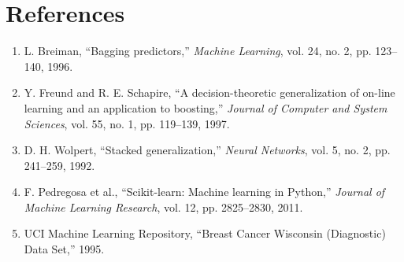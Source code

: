 \documentclass[12pt,a4paper]{article}
\begin{document}
\section{References}
\begin{enumerate}
    \item L. Breiman, ``Bagging predictors,'' \textit{Machine Learning}, vol. 24, no. 2, pp. 123--140, 1996.
    \item Y. Freund and R. E. Schapire, ``A decision-theoretic generalization of on-line learning and an application to boosting,'' \textit{Journal of Computer and System Sciences}, vol. 55, no. 1, pp. 119--139, 1997.
    \item D. H. Wolpert, ``Stacked generalization,'' \textit{Neural Networks}, vol. 5, no. 2, pp. 241--259, 1992.
    \item F. Pedregosa et al., ``Scikit-learn: Machine learning in Python,'' \textit{Journal of Machine Learning Research}, vol. 12, pp. 2825--2830, 2011.
    \item UCI Machine Learning Repository, ``Breast Cancer Wisconsin (Diagnostic) Data Set,'' 1995.
\end{enumerate}
\end{document}
